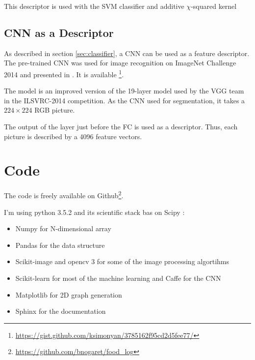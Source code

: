 This descriptor is used with the SVM classifier and additive $\chi$-squared kernel

\subsection{CNN as a Descriptor}

As described in section \ref{sec:classifier}, a CNN can be used as a feature descriptor. The pre-trained CNN was used for image recognition on ImageNet Challenge 2014 and presented in  \cite{Simonyan2014}. It is available \footnote{\url{https://gist.github.com/ksimonyan/3785162f95cd2d5fee77/}}.

The model is an improved version of the 19-layer model used by the VGG team in the ILSVRC-2014 competition. As the CNN used for segmentation, it takes a $224 \times 224$ RGB picture.

The output of the layer just before the FC is used as a descriptor. Thus, each picture is described by a 4096 feature vectors.

\section{Code}

The code is freely available on Github\footnote{\url{https://github.com/bnogaret/food_log}}.

I'm using python 3.5.2 and its scientific stack bas on Scipy \cite{Oliphant2007}:
\begin{itemize}
    \item Numpy \cite{VanDerWalt2011} for N-dimensional array
    \item Pandas \cite{McKinney2010} for the data structure
    \item Scikit-image \cite{VanderWalt2014} and opencv 3 \cite{Bradski2000} for some of the image processing algortihms
    \item Scikit-learn \cite{Pedregosa2012} for most of the machine learning and Caffe \cite{Jia2014a}  for the CNN
    \item Matplotlib \cite{Hunter2007} for 2D graph generation
    \item Sphinx for the documentation
\end{itemize}
